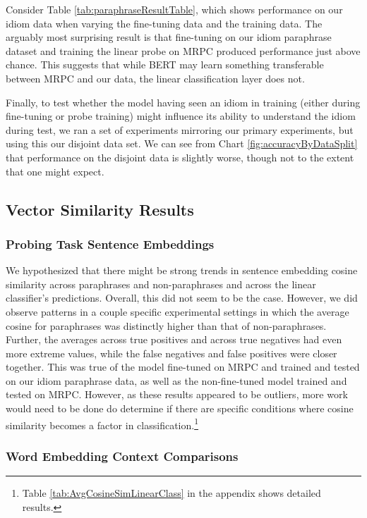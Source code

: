 \documentclass[11pt,a4paper]{article}
\begin{document}
 Consider Table \ref{tab:paraphraseResultTable}, which shows performance on our idiom data when varying the fine-tuning data and the training data. The arguably most surprising result is that fine-tuning on our idiom paraphrase dataset and training the linear probe on MRPC produced performance just above chance. This suggests that while BERT may learn something transferable between MRPC and our data, the linear classification layer does not. 

Finally, to test whether the model having seen an idiom in training (either during fine-tuning or probe training) might influence its ability to understand the idiom during test, we ran a set of experiments mirroring our primary experiments, but using this our disjoint data set. We can see from Chart \ref{fig:accuracyByDataSplit} that performance on the disjoint data is slightly worse, though not to the extent that one might expect. 


\subsection{Vector Similarity Results}

\subsubsection{Probing Task Sentence Embeddings}
We hypothesized that there might be strong trends in sentence embedding cosine similarity across paraphrases and non-paraphrases and across the linear classifier's predictions. Overall, this did not seem to be the case. However, we did observe patterns in a couple specific experimental settings in which the average cosine for paraphrases was distinctly higher than that of non-paraphrases. Further, the averages across true positives and across true negatives had even more extreme values, while the false negatives and false positives were closer together. This was true of the model fine-tuned on MRPC and trained and tested on our idiom paraphrase data, as well as the non-fine-tuned model trained and tested on MRPC. However, as these results appeared to be outliers, more work would need to be done do determine if there are specific conditions where cosine similarity becomes a factor in classification.\footnote{Table \ref{tab:AvgCosineSimLinearClass} in the appendix shows detailed results.}

\noindent
\subsubsection{Word Embedding Context Comparisons}
\end{document}
